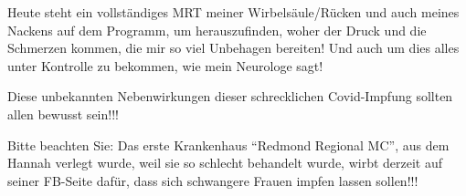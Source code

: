 Heute steht ein vollständiges MRT meiner Wirbelsäule/Rücken und auch meines
Nackens auf dem Programm, um herauszufinden, woher der Druck und die Schmerzen
kommen, die mir so viel Unbehagen bereiten! Und auch um dies alles unter
Kontrolle zu bekommen, wie mein Neurologe sagt!

Diese unbekannten Nebenwirkungen dieser schrecklichen Covid-Impfung sollten
allen bewusst sein!!!

Bitte beachten Sie: Das erste Krankenhaus ``Redmond Regional MC'', aus dem
Hannah verlegt wurde, weil sie so schlecht behandelt wurde, wirbt derzeit auf
seiner FB-Seite dafür, dass sich schwangere Frauen impfen lassen sollen!!!
